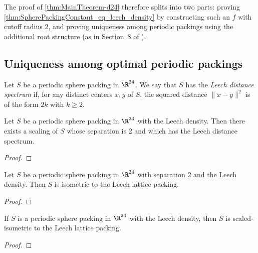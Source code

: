 \begin{remark}
  The proof of \cref{thm:MainTheorem-d24} therefore splits into two parts: proving \cref{thm:SpherePackingConstant_eq_leech_density} by constructing such an $f$ with cutoff radius $2$, and proving uniqueness among periodic packings using the additional root structure (as in Section~8 of \cite{ElkiesCohn}).
\end{remark}

\subsection{Uniqueness among optimal periodic packings}

\begin{definition}\label{def:leech-distance-spectrum}\leanok
  Let $S$ be a periodic sphere packing in $\R^{24}$. We say that $S$ has the \emph{Leech distance spectrum}
  if, for any distinct centers $x,y$ of $S$, the squared distance $\|x-y\|^2$ is of the form $2k$ with
  $k\ge 2$.
\end{definition}

\begin{theorem}\label{thm:optimal-implies-leech-distance-spectrum}\leanok
  Let $S$ be a periodic sphere packing in $\R^{24}$ with the Leech density.
  Then there exists a scaling of $S$ whose separation is $2$ and which has the Leech distance spectrum.
\end{theorem}
\begin{proof}\leanok
\end{proof}

\begin{theorem}\label{thm:leech-rigidity-normalized}\leanok
  Let $S$ be a periodic sphere packing in $\R^{24}$ with separation $2$ and the Leech density.
  Then $S$ is isometric to the Leech lattice packing.
\end{theorem}
\begin{proof}\leanok
\end{proof}

\begin{theorem}\label{thm:leech-unique-optimal-periodic}\leanok
  If $S$ is a periodic sphere packing in $\R^{24}$ with the Leech density, then $S$ is scaled-isometric to
  the Leech lattice packing.
\end{theorem}
\begin{proof}\leanok
\end{proof}

